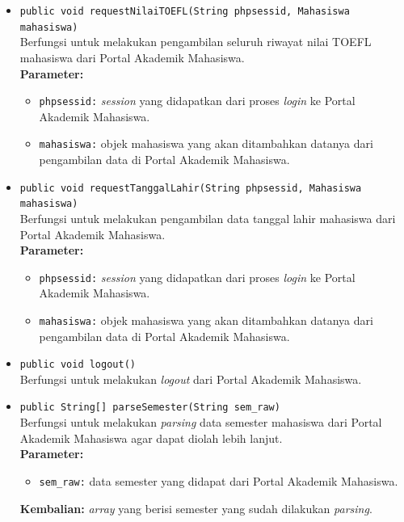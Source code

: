 \begin{enumerate}
\begin{itemize}
		\item \texttt{public void requestNilaiTOEFL(String phpsessid, Mahasiswa mahasiswa)}\\
	    Berfungsi untuk melakukan pengambilan seluruh riwayat nilai TOEFL mahasiswa dari Portal Akademik Mahasiswa.\\
		\textbf{Parameter:}
			\begin{itemize}
				\item \texttt{phpsessid:} \textit{session} yang didapatkan dari proses \textit{login} ke Portal Akademik Mahasiswa.
				\item \texttt{mahasiswa:} objek mahasiswa yang akan ditambahkan datanya dari pengambilan data di Portal Akademik Mahasiswa.
			\end{itemize}
			
		\item \texttt{public void requestTanggalLahir(String phpsessid, Mahasiswa mahasiswa)}\\
	    Berfungsi untuk melakukan pengambilan data tanggal lahir mahasiswa dari Portal Akademik Mahasiswa.\\
		\textbf{Parameter:}
			\begin{itemize}
				\item \texttt{phpsessid:} \textit{session} yang didapatkan dari proses \textit{login} ke Portal Akademik Mahasiswa.
				\item \texttt{mahasiswa:} objek mahasiswa yang akan ditambahkan datanya dari pengambilan data di Portal Akademik Mahasiswa.
			\end{itemize}
			
		\item \texttt{public void logout()}\\
	    Berfungsi untuk melakukan \textit{logout} dari Portal Akademik Mahasiswa.
		
		\item \texttt{public String[] parseSemester(String sem\_raw)}\\
	    Berfungsi untuk melakukan \textit{parsing} data semester mahasiswa dari Portal Akademik Mahasiswa agar dapat diolah lebih lanjut.\\
		\textbf{Parameter:}
			\begin{itemize}
				\item \texttt{sem\_raw:} data semester yang didapat dari Portal Akademik Mahasiswa.
			\end{itemize}
		\textbf{Kembalian:} \textit{array} yang berisi semester yang sudah dilakukan \textit{parsing}.
		

\end{itemize}
\end{enumerate}
